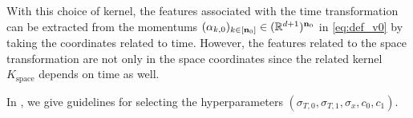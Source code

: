     \begin{remark}
      With this choice of kernel, the features associated with the time transformation can be extracted from the momentums $(\alpha_{k,0})_{k\in[\mathbf{n}_0]}\in (\mathbb{R}^{d+1})^{\mathbf{n}_0}$ in \eqref{eq:def_v0} by taking the coordinates related to time.
      However, the features related to the space transformation are not only in the space coordinates since the related kernel $K_{\text{space}}$ depends on time as well.
      \end{remark}
      In , we give guidelines for selecting the hyperparameters $(\sigma_{T,0},\sigma_{T,1},\sigma_x,c_0,c_1)$.
  
  
    








